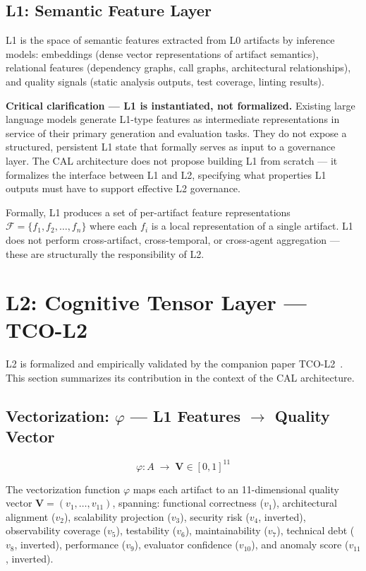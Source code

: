 \documentclass[11pt]{article}
\theoremstyle{definition}
\theoremstyle{remark}
\begin{document}
\subsection{L1: Semantic Feature Layer}

L1 is the space of semantic features extracted from L0 artifacts by
inference models: embeddings (dense vector representations of
artifact semantics), relational features (dependency graphs, call
graphs, architectural relationships), and quality signals (static
analysis outputs, test coverage, linting results).

\medskip
\noindent\textbf{Critical clarification --- L1 is instantiated, not
formalized.} Existing large language models generate L1-type features
as intermediate representations in service of their primary
generation and evaluation tasks. They do not expose a structured,
persistent L1 state that formally serves as input to a governance
layer. The CAL architecture does not propose building L1 from
scratch --- it formalizes the interface between L1 and L2, specifying
what properties L1 outputs must have to support effective L2
governance.

Formally, L1 produces a set of per-artifact feature representations
$\mathcal{F} = \{f_1, f_2, \ldots, f_n\}$ where each $f_i$ is a
local representation of a single artifact. L1 does not perform
cross-artifact, cross-temporal, or cross-agent aggregation --- these
are structurally the responsibility of L2.

\section{L2: Cognitive Tensor Layer --- TCO-L2}
\label{sec:l2}

L2 is formalized and empirically validated by the companion paper
TCO-L2~\cite{chancay2026tco}. This section summarizes its
contribution in the context of the CAL architecture.

\subsection{Vectorization: $\varphi$ --- L1 Features $\to$ Quality Vector}

\[
  \varphi: A \;\to\; \mathbf{V} \in [0,1]^{11}
\]

The vectorization function $\varphi$ maps each artifact to an
11-dimensional quality vector
$\mathbf{V} = (v_1, \ldots, v_{11})$, spanning: functional
correctness ($v_1$), architectural alignment ($v_2$), scalability
projection ($v_3$), security risk ($v_4$, inverted), observability
coverage ($v_5$), testability ($v_6$), maintainability ($v_7$),
technical debt ($v_8$, inverted), performance ($v_9$), evaluator
confidence ($v_{10}$), and anomaly score ($v_{11}$, inverted).
\end{document}
